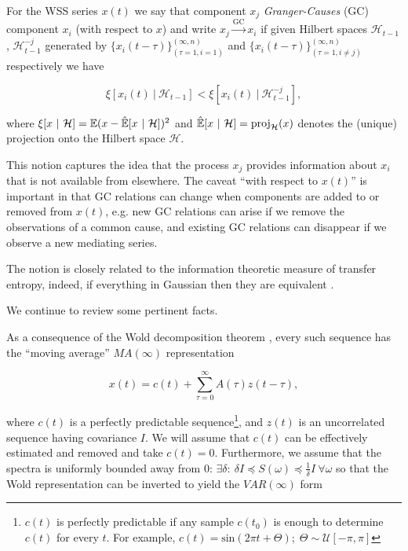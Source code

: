 \documentclass[12pt]{article}
\def\gc{\overset{\text{GC}}{\rightarrow}}  %
\newcommand{\linE}[2]{\hat{\E}[#1\ |\ #2]}  %
\newcommand{\linEerr}[2]{\xi[#1\ |\ #2]}  %
\begin{document}
\begin{definition}
  For the WSS series $x(t)$ we say that component $x_j$
  \textit{Granger-Causes} (GC) component $x_i$ (with respect to $x$)
  and write $x_j \gc x_i$ if given Hilbert spaces
  $\mathcal{H}_{t - 1}$, $\mathcal{H}^{-j}_{t - 1}$
  generated by $\{x_i(t - \tau)\}_{(\tau = 1, i = 1)}^{(\infty, n)}$ and
  $\{x_i(t - \tau)\}_{(\tau = 1, i \ne j)}^{(\infty, n)}$ respectively we have

\begin{equation}
  \linEerr{x_i(t)}{\mathcal{H}_{t - 1}} < \linEerr{x_i(t)}{\mathcal{H}^{-j}_{t - 1}},
\end{equation}

where
$\xi[x \ |\ \mathcal{H}] = \E (x - \linE{x}{\mathcal{H}})^2$ and
$\linE{x}{\mathcal{H}} = \text{proj}_{\mathcal{H}}(x)$ denotes
the (unique) projection onto the Hilbert space $\mathcal{H}$.
\end{definition}

This notion captures the idea that the process $x_j$ provides
information about $x_i$ that is not available from elsewhere.  The
caveat ``with respect to $x(t)$'' is important in that GC relations
can change when components are added to or removed from $x(t)$,
e.g. new GC relations can arise if we remove the observations of a
common cause, and existing GC relations can disappear if we observe a
new mediating series.

The notion is closely related to the information theoretic measure of
transfer entropy, indeed, if everything in Gaussian then they are
equivalent \cite{barnett2009granger}.

We continue to review some pertinent facts.

As a consequence of the Wold decomposition theorem \cite{lindquist},
every such sequence has the ``moving average'' $MA(\infty)$ representation

\begin{equation}
\label{eqn:wold}
  x(t) = c(t) + \sum_{\tau = 0}^\infty A(\tau) z(t - \tau),
\end{equation}

where $c(t)$ is a perfectly predictable sequence\footnote{$c(t)$ is
  perfectly predictable if any sample $c(t_0)$ is enough to determine
  $c(t)$ for every $t$.  For example,
  $c(t) = \text{sin}(2\pi t + \Theta);\; \Theta \sim \mathcal{U}[-\pi, \pi]$}, and
$z(t)$ is an uncorrelated sequence having covariance $I$.  We will assume
that $c(t)$ can be effectively estimated and removed and take
$c(t) = 0$.  Furthermore, we assume that the spectra is uniformly
bounded away from $0$:
$\exists \delta:\ \delta I \preceq S(\omega) \preceq \frac{1}{\delta} I\ \forall \omega$ so that the Wold
representation can be inverted to yield the $VAR(\infty)$ form
\end{document}
